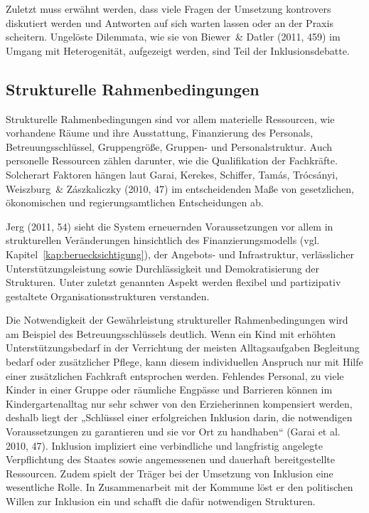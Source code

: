 Zuletzt muss erwähnt werden, dass viele Fragen der Umsetzung kontrovers diskutiert werden und Antworten auf sich warten lassen oder an der Praxis scheitern. Ungelöste Dilemmata, wie sie von Biewer~\& Datler (2011, 459) im Umgang mit Heterogenität, aufgezeigt werden, sind Teil der Inklusionsdebatte. 

\subsection{Strukturelle Rahmenbedingungen}
Strukturelle Rahmenbedingungen sind vor allem materielle Ressourcen, wie vorhandene Räume und ihre Ausstattung, Finanzierung des Personals, Betreuungsschlüssel, Gruppengröße, Gruppen- und Personalstruktur. Auch personelle Ressourcen zählen darunter, wie die Qualifikation der Fachkräfte. Solcherart Faktoren hängen laut Garai, Kerekes, Schiffer, Tamás, Trócsányi, Weiszburg~\& Zászkaliczky (2010, 47) im entscheidenden Maße von gesetzlichen, ökonomischen und regierungsamtlichen Entscheidungen ab. 

Jerg (2011, 54) sieht die System erneuernden Voraussetzungen vor allem in  strukturellen Veränderungen hinsichtlich des Finanzierungsmodells (vgl. Kapitel~\ref{kap:beruecksichtigung}), der Angebots- und Infrastruktur, verlässlicher Unterstützungsleistung sowie Durchlässigkeit und Demokratisierung der Strukturen. Unter zuletzt genannten Aspekt werden flexibel und partizipativ gestaltete Organisationsstrukturen verstanden.  



Die Notwendigkeit der Gewährleistung struktureller Rahmenbedingungen wird am Beispiel des Betreuungsschlüssels deutlich. Wenn ein Kind mit erhöhten Unterstützungsbedarf in der Verrichtung der meisten Alltagsaufgaben Begleitung bedarf oder zusätzlicher Pflege, kann diesem individuellen Anspruch nur mit Hilfe einer zusätzlichen Fachkraft entsprochen werden. Fehlendes Personal, zu viele Kinder in einer Gruppe oder räumliche Engpässe und Barrieren können im Kindergartenalltag nur sehr schwer von den Erzieherinnen kompensiert werden, deshalb liegt der „Schlüssel einer erfolgreichen Inklusion darin, die notwendigen Voraussetzungen zu garantieren und sie vor Ort zu handhaben“ (Garai et al. 2010, 47). Inklusion impliziert eine verbindliche und langfristig angelegte Verpflichtung des Staates sowie angemessenen und dauerhaft bereitgestellte Ressourcen.
Zudem spielt der Träger bei der Umsetzung von Inklusion eine wesentliche Rolle. In Zusammenarbeit mit der Kommune löst er den politischen Willen zur Inklusion ein und schafft die dafür notwendigen Strukturen.

